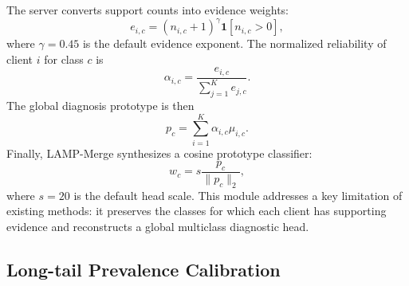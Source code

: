 \documentclass[letterpaper]{article} %
\begin{document}
The server converts support counts into evidence weights:
\begin{equation}
e_{i,c}=(n_{i,c}+1)^\gamma \mathbf{1}[n_{i,c}>0],
\end{equation}
where $\gamma=0.45$ is the default evidence exponent. The normalized reliability of client $i$ for class $c$ is
\begin{equation}
\alpha_{i,c}=\frac{e_{i,c}}{\sum_{j=1}^{K} e_{j,c}}.
\end{equation}
The global diagnosis prototype is then
\begin{equation}
p_c=\sum_{i=1}^{K}\alpha_{i,c}\mu_{i,c}.
\end{equation}
Finally, LAMP-Merge synthesizes a cosine prototype classifier:
\begin{equation}
w_c=s\frac{p_c}{\|p_c\|_2},
\end{equation}
where $s=20$ is the default head scale. This module addresses a key limitation of existing methods: it preserves the classes for which each client has supporting evidence and reconstructs a global multiclass diagnostic head.

\subsection{Long-tail Prevalence Calibration}
\end{document}
